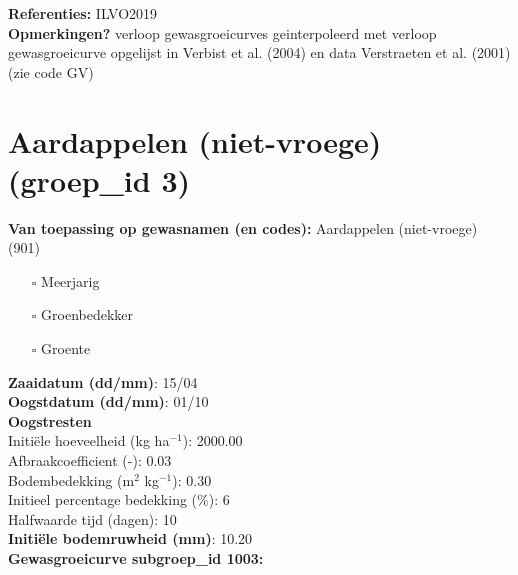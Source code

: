 \documentclass{article}
\begin{document}
  \textbf{Referenties:} ILVO2019 \vspace{0.10cm} \\ 
  \textbf{Opmerkingen?} verloop gewasgroeicurves geinterpoleerd met verloop gewasgroeicurve opgelijst in Verbist et al. (2004) en data Verstraeten et al. (2001) (zie code GV) \vspace{0.10cm} \\ 
 \newpage 
 \section{Aardappelen (niet-vroege) (groep\_id 3)} 
 \textbf{Van toepassing op gewasnamen (en codes):} Aardappelen (niet-vroege) (901) 
 \begin{multicols}{3} \begin{itemize} \item[$\square$] Meerjarig \item[$\square$] Groenbedekker \item[$\square$] Groente \end{itemize} \end{multicols} 
  \textbf{Zaaidatum (dd/mm)}: 15/04  \vspace{0.10cm} \\ 
  \textbf{Oogstdatum (dd/mm)}: 01/10  \vspace{0.10cm} \\ 
  \textbf{Oogstresten} \vspace{0.05cm} \\ 
  \tab Initi\"{e}le hoeveelheid (kg ha$^{-1}$): 2000.00 \vspace{0.05cm} \\ 
  \tab Afbraakcoefficient (-): 0.03 \vspace{0.05cm} \\ 
  \tab Bodembedekking (m$^2$ kg$^{-1}$): 0.30 \vspace{0.05cm} \\ 
  \tab Initieel percentage bedekking (\%): 6 \vspace{0.05cm} \\ 
  \tab Halfwaarde tijd (dagen): 10 \vspace{0.05cm} \\ 
  \textbf{Initi\"{e}le bodemruwheid (mm)}: 10.20 \vspace{0.05cm} \\ 
  \textbf{Gewasgroeicurve subgroep\_id 1003:} 
\end{document}
